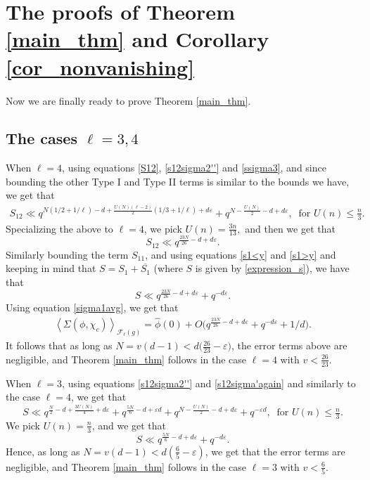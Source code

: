 \documentclass[12pt]{amsart}
\begin{document}
\section{The proofs of Theorem \ref{main_thm} and Corollary \ref{cor_nonvanishing}}
\label{proof}
Now we are finally ready to prove Theorem \ref{main_thm}. 
\subsection{The cases $\ell=3,4$}
When $\ell=4$, using equations \eqref{S12}, \eqref{s12sigma2''} and \eqref{ssigma3}, and since bounding the other Type I and Type II terms is similar to the bounds we have, we get that 
\begin{align*}
S_{12} \ll  q^{N(1/2+1/\ell)-d+ \frac{ U(N) (\ell-2)}{2}( 1/3+1/\ell) + d \varepsilon} + q^{N - \frac{U(N)}{2}-d+d\varepsilon}, \;\; \text{for } U(n) \leq \tfrac{n}{3}.
\end{align*}
Specializing the above to $\ell=4$, we pick
$U(n)= \frac{3n}{13},$ and then we get that
$$S_{12} \ll q^{\frac{23N}{26}-d+d \varepsilon}.$$
Similarly bounding the term $S_{11}$, and using equations \eqref{s1<y} and \eqref{s1>y} and keeping in mind that $S=S_1 + \overline{S_1}$ (where $S$ is given by \eqref{expression_s}), we have that
$$S \ll q^{\frac{23N}{26}-d+d \varepsilon} +q^{-d\varepsilon}.$$
Using equation \eqref{sigma1avg}, we get that 
\begin{align*}
\left\langle\Sigma(\phi,\chi_c)\right\rangle_{\mathcal{F}_\ell(g)} =  \widehat{\phi}(0) + O \Big( q^{\frac{23N}{26}-d+d \varepsilon} +q^{-d\varepsilon} + 1/d \Big).
\end{align*}
It follows that as long as $N = v(d-1) < d \Big(\frac{26}{23}- \varepsilon \Big)$, the error terms above are negligible, and Theorem \ref{main_thm} follows in the case $\ell=4$ with $v < \tfrac{26}{23}$.

When $\ell=3$, using equations \eqref{s12sigma2''} and \eqref{s12sigma'again} and similarly to the case $\ell=4$, we get that
$$S  \ll  q^{\frac{N}{2}-d+\frac{3U(N)}{4}+ d \varepsilon}+q^{\frac{5N}{6}-d+\varepsilon d}+ q^{N-\frac{U(N)}{2}-d+d\varepsilon}+ q^{-\varepsilon d},    \;\; \text{for } U(n) \leq \tfrac{n}{3}.$$
We pick $U(n)=\tfrac{n}{3}$, and we get that
$$S \ll q^{\frac{5N}{6}-d+d \varepsilon} + q^{-d\varepsilon}.$$
Hence, as long as $N = v(d-1) < d(\frac{6}{5}-\varepsilon)$, we get that the error terms are negligible, and Theorem \ref{main_thm} follows in the case $\ell=3$ with $v < \tfrac{6}{5}$.
\end{document}
